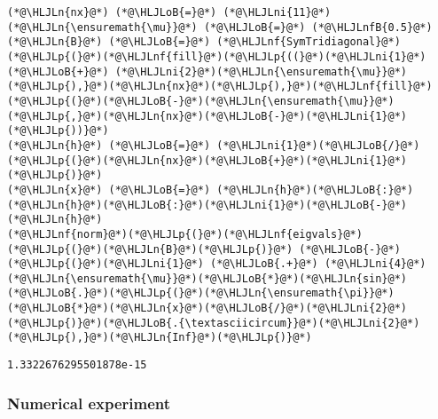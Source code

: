 \documentclass[12pt,a4paper]{article}
\newcommand{\HLJLn}[1]{#1}
\newcommand{\HLJLnf}[1]{\textcolor[RGB]{66,102,213}{#1}}
\newcommand{\HLJLnfB}[1]{\textcolor[RGB]{59,151,46}{#1}}
\newcommand{\HLJLni}[1]{\textcolor[RGB]{59,151,46}{#1}}
\newcommand{\HLJLoB}[1]{\textcolor[RGB]{102,102,102}{\textbf{#1}}}
\newcommand{\HLJLp}[1]{#1}
\begin{document}
\begin{lstlisting}
(*@\HLJLn{nx}@*) (*@\HLJLoB{=}@*) (*@\HLJLni{11}@*)
(*@\HLJLn{\ensuremath{\mu}}@*) (*@\HLJLoB{=}@*) (*@\HLJLnfB{0.5}@*)
(*@\HLJLn{B}@*) (*@\HLJLoB{=}@*) (*@\HLJLnf{SymTridiagonal}@*)(*@\HLJLp{(}@*)(*@\HLJLnf{fill}@*)(*@\HLJLp{((}@*)(*@\HLJLni{1}@*) (*@\HLJLoB{+}@*) (*@\HLJLni{2}@*)(*@\HLJLn{\ensuremath{\mu}}@*)(*@\HLJLp{),}@*)(*@\HLJLn{nx}@*)(*@\HLJLp{),}@*)(*@\HLJLnf{fill}@*)(*@\HLJLp{(}@*)(*@\HLJLoB{-}@*)(*@\HLJLn{\ensuremath{\mu}}@*)(*@\HLJLp{,}@*)(*@\HLJLn{nx}@*)(*@\HLJLoB{-}@*)(*@\HLJLni{1}@*)(*@\HLJLp{))}@*)
(*@\HLJLn{h}@*) (*@\HLJLoB{=}@*) (*@\HLJLni{1}@*)(*@\HLJLoB{/}@*)(*@\HLJLp{(}@*)(*@\HLJLn{nx}@*)(*@\HLJLoB{+}@*)(*@\HLJLni{1}@*)(*@\HLJLp{)}@*)
(*@\HLJLn{x}@*) (*@\HLJLoB{=}@*) (*@\HLJLn{h}@*)(*@\HLJLoB{:}@*)(*@\HLJLn{h}@*)(*@\HLJLoB{:}@*)(*@\HLJLni{1}@*)(*@\HLJLoB{-}@*)(*@\HLJLn{h}@*)
(*@\HLJLnf{norm}@*)(*@\HLJLp{(}@*)(*@\HLJLnf{eigvals}@*)(*@\HLJLp{(}@*)(*@\HLJLn{B}@*)(*@\HLJLp{)}@*) (*@\HLJLoB{-}@*) (*@\HLJLp{(}@*)(*@\HLJLni{1}@*) (*@\HLJLoB{.+}@*) (*@\HLJLni{4}@*)(*@\HLJLn{\ensuremath{\mu}}@*)(*@\HLJLoB{*}@*)(*@\HLJLn{sin}@*)(*@\HLJLoB{.}@*)(*@\HLJLp{(}@*)(*@\HLJLn{\ensuremath{\pi}}@*)(*@\HLJLoB{*}@*)(*@\HLJLn{x}@*)(*@\HLJLoB{/}@*)(*@\HLJLni{2}@*)(*@\HLJLp{)}@*)(*@\HLJLoB{.{\textasciicircum}}@*)(*@\HLJLni{2}@*)(*@\HLJLp{),}@*)(*@\HLJLn{Inf}@*)(*@\HLJLp{)}@*)
\end{lstlisting}

\begin{lstlisting}
1.3322676295501878e-15
\end{lstlisting}


\subsubsection{Numerical experiment}
\end{document}
